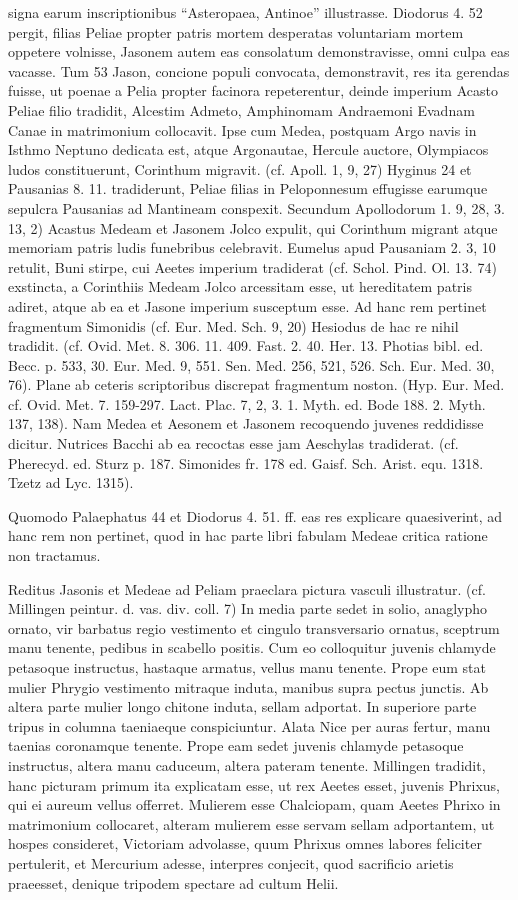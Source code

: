 \documentclass[a4paper, 11pt, oneside, polutonikogreek, german]{article}
\begin{document}
signa earum inscriptionibus "`Asteropaea, Antinoe"' illustrasse. Diodorus 4. 52 pergit, filias Peliae propter patris mortem desperatas voluntariam mortem oppetere volnisse, Jasonem autem eas consolatum demonstravisse, omni culpa eas vacasse. Tum 53 Jason, concione populi convocata, demonstravit, res ita gerendas fuisse, ut poenae a Pelia propter facinora repeterentur, deinde imperium Acasto Peliae filio tradidit, Alcestim Admeto, Amphinomam Andraemoni Evadnam Canae in matrimonium collocavit. Ipse cum Medea, postquam Argo navis in Isthmo Neptuno dedicata est, atque Argonautae, Hercule auctore, Olympiacos ludos constituerunt, Corinthum migravit. (cf. Apoll. 1, 9, 27) Hyginus 24 et Pausanias 8. 11. tradiderunt, Peliae filias in Peloponnesum effugisse earumque sepulcra Pausanias ad Mantineam conspexit. Secundum Apollodorum 1. 9, 28, 3. 13, 2) Acastus Medeam et Jasonem Jolco expulit, qui Corinthum migrant atque memoriam patris ludis funebribus celebravit. Eumelus apud Pausaniam 2. 3, 10 retulit, Buni stirpe, cui Aeetes imperium tradiderat (cf. Schol. Pind. Ol. 13. 74) exstincta, a Corinthiis Medeam Jolco arcessitam esse, ut hereditatem patris adiret, atque ab ea et Jasone imperium susceptum esse. Ad hanc rem pertinet fragmentum Simonidis (cf. Eur. Med. Sch. 9, 20) Hesiodus de hac re nihil tradidit. (cf. Ovid. Met. 8. 306. 11. 409. Fast. 2. 40. Her. 13. Photias bibl. ed. Becc. p. 533, 30. Eur. Med. 9, 551. Sen. Med. 256, 521, 526. Sch. Eur. Med. 30, 76). Plane ab ceteris scriptoribus discrepat fragmentum noston. (Hyp. Eur. Med. cf. Ovid. Met. 7. 159-297. Lact. Plac. 7, 2, 3. 1. Myth. ed. Bode 188. 2. Myth. 137, 138). Nam Medea et Aesonem et Jasonem recoquendo juvenes reddidisse dicitur. Nutrices Bacchi ab ea recoctas esse jam Aeschylas tradiderat. (cf. Pherecyd. ed. Sturz p. 187. Simonides fr. 178 ed. Gaisf. Sch. Arist. equ. 1318. Tzetz ad Lyc. 1315).

Quomodo Palaephatus 44 et Diodorus 4. 51. ff. eas res explicare quaesiverint, ad hanc rem non pertinet, quod in hac parte libri fabulam Medeae critica ratione non tractamus.

Reditus Jasonis et Medeae ad Peliam praeclara pictura vasculi illustratur. (cf. Millingen peintur. d. vas. div. coll. 7) In media parte sedet in solio, anaglypho ornato, vir barbatus regio vestimento et cingulo transversario ornatus, sceptrum manu tenente, pedibus in scabello positis. Cum eo colloquitur juvenis chlamyde petasoque instructus, hastaque armatus, vellus manu tenente. Prope eum stat mulier Phrygio vestimento mitraque induta, manibus supra pectus junctis. Ab altera parte mulier longo chitone induta, sellam adportat. In superiore parte tripus in columna taeniaeque conspiciuntur. Alata Nice per auras fertur, manu taenias coronamque tenente. Prope eam sedet juvenis chlamyde petasoque instructus, altera manu caduceum, altera pateram tenente. Millingen tradidit, hanc picturam primum ita explicatam esse, ut rex Aeetes esset, juvenis Phrixus, qui ei aureum vellus offerret. Mulierem esse Chalciopam, quam Aeetes Phrixo in matrimonium collocaret, alteram mulierem esse servam sellam adportantem, ut hospes consideret, Victoriam advolasse, quum Phrixus omnes labores feliciter pertulerit, et Mercurium adesse, interpres conjecit, quod sacrificio arietis praeesset, denique tripodem spectare ad cultum Helii.
\end{document}
